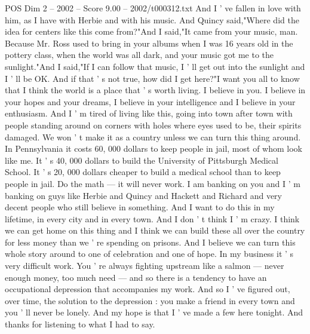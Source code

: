 \begin{textsample}{POS Dim 2 – 2002 – Score 9.00 – 2002/t000312.txt}
And I ' ve fallen in love with him, as I have with Herbie and with his music.
And Quincy said,"Where did the idea for centers like this come from?"And I said,"It came from your music, man.
Because Mr.
Ross used to bring in your albums when I was 16 years old in the pottery class, when the world was all dark, and your music got me to the sunlight."And I said,"If I can follow that music, I ' ll get out into the sunlight and I ' ll be OK.
And if that ' s not true, how did I get here?"I want you all to know that I think the world is a place that ' s worth living.
I believe in you.
I believe in your hopes and your dreams, I believe in your intelligence and I believe in your enthusiasm.
And I ' m tired of living like this, going into town after town with people standing around on corners with holes where eyes used to be, their spirits damaged.
We won ' t make it as a country unless we can turn this thing around.
In Pennsylvania it costs 60, 000 dollars to keep people in jail, most of whom look like me.
It ' s 40, 000 dollars to build the University of Pittsburgh Medical School.
It ' s 20, 000 dollars cheaper to build a medical school than to keep people in jail.
Do the math — it will never work.
I am banking on you and I ' m banking on guys like Herbie and Quincy and Hackett and Richard and very decent people who still believe in something.
And I want to do this in my lifetime, in every city and in every town.
And I don ' t think I ' m crazy.
I think we can get home on this thing and I think we can build these all over the country for less money than we ' re spending on prisons.
And I believe we can turn this whole story around to one of celebration and one of hope.
In my business it ' s very difficult work.
You ' re always fighting upstream like a salmon — never enough money, too much need — and so there is a tendency to have an occupational depression that accompanies my work.
And so I ' ve figured out, over time, the solution to the depression : you make a friend in every town and you ' ll never be lonely.
And my hope is that I ' ve made a few here tonight.
And thanks for listening to what I had to say.

\end{textsample}
